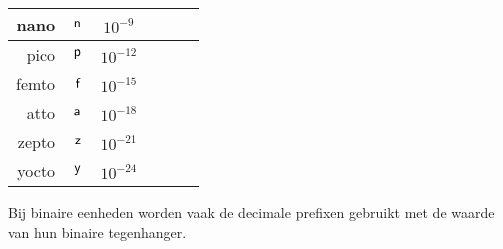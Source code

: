 \begin{center}
\begin{tabular}{|r|c|c||r|c|c|}
\hline
      nano & $\,\textsf{n}\,$ & $10^{-9^{\phantom n}}$ &            &            &            \\
\hline
      pico & $\,\textsf{p}\,$ & $10^{-12^{\phantom n}}$ &            &            &            \\
\hline
     femto & $\,\textsf{f}\,$ & $10^{-15^{\phantom n}}$ &            &            &            \\
\hline
      atto & $\,\textsf{a}\,$ & $10^{-18^{\phantom n}}$ &            &            &            \\
\hline
     zepto & $\,\textsf{z}\,$ & $10^{-21^{\phantom n}}$ &            &            &            \\
\hline
     yocto & $\,\textsf{y}\,$ & $10^{-24^{\phantom n}}$ &            &            &            \\
\hline
\end{tabular}  
\end{center}

\begin{opmerking}
 Bij binaire eenheden worden vaak de decimale prefixen gebruikt met de waarde van hun binaire tegenhanger.
\end{opmerking}

